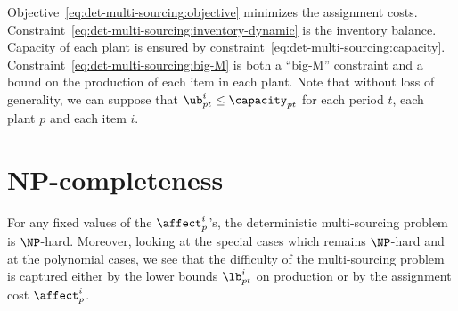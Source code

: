 Objective~\eqref{eq:det-multi-sourcing:objective} minimizes the assignment costs.
Constraint~\eqref{eq:det-multi-sourcing:inventory-dynamic} is the inventory balance.
Capacity of each plant is ensured by constraint~\eqref{eq:det-multi-sourcing:capacity}.
Constraint~\eqref{eq:det-multi-sourcing:big-M} is both a ``big-M'' constraint and a bound on the production of each item in each plant.
Note that without loss of generality, we can suppose that $\ub_{pt}^i \le \capacity_{pt}$ for each period $t$, each plant $p$ and each item $i$.







\section{NP-completeness}
\label{sec:multi-sourcing:deterministic:NP-completeness}


For any fixed values of the $\affect_p^i$'s, the deterministic multi-sourcing problem is $\NP$-hard.
Moreover, looking at the special cases which remains $\NP$-hard and at the polynomial cases, we see that the difficulty of the multi-sourcing problem is captured either by the lower bounds $\lb_{pt}^i$ on production or by the assignment cost $\affect_p^i$.



